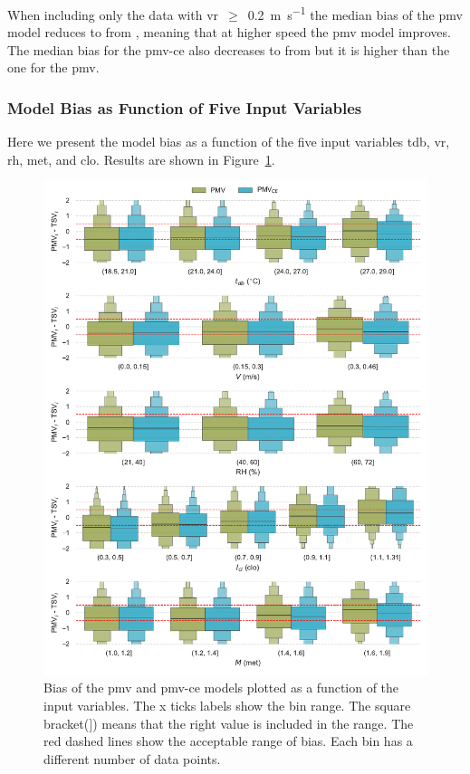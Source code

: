 When including only the data with \ac{vr}~$\geq$~\qty{0.2}{\m\per\s} the median bias of the \ac{pmv} model reduces to  from , meaning that at higher speed the \ac{pmv} model improves.
The median bias for the \ac{pmv-ce} also decreases to  from  but it is higher than the one for the \ac{pmv}.

\subsubsection{Model Bias as Function of Five Input Variables}\label{subsubsec:model-bias-variable}
Here we present the model bias as a function of the five input variables \ac{tdb}, \ac{vr}, \ac{rh}, \ac{met}, and \ac{clo}.
Results are shown in Figure~\ref{fig:bias_models}.
\begin{figure}[htb!]
    \centering
    \includegraphics[width=\textwidth]{figures/bias_models}
    \caption{Bias of the \ac{pmv} and \ac{pmv-ce} models plotted as a function of the input variables.
    The x ticks labels show the bin range.
    The square bracket($]$) means that the right value is included in the range.
    The red dashed lines show the acceptable range of bias.
    Each bin has a different number of data points.
    }
    \label{fig:bias_models}
\end{figure}

